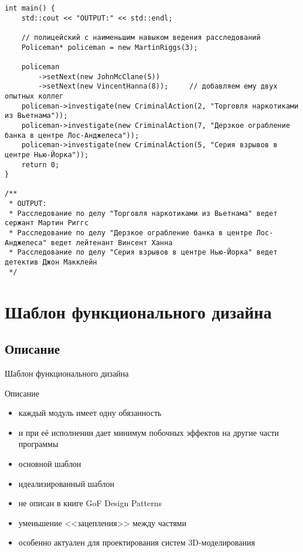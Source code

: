 \documentclass{beamer}
\begin{document}
\begin{frame}[fragile]
\begin{verbatim}
int main() {
	std::cout << "OUTPUT:" << std::endl;

	// полицейский с наименьшим навыком ведения расследований
	Policeman* policeman = new MartinRiggs(3);  

	policeman
		->setNext(new JohnMcClane(5))
		->setNext(new VincentHanna(8));     // добавляем ему двух опытных коллег
	policeman->investigate(new CriminalAction(2, "Торговля наркотиками из Вьетнама"));
	policeman->investigate(new CriminalAction(7, "Дерзкое ограбление банка в центре Лос-Анджелеса"));
	policeman->investigate(new CriminalAction(5, "Серия взрывов в центре Нью-Йорка"));
	return 0;
}

/**
 * OUTPUT:
 * Расследование по делу "Торговля наркотиками из Вьетнама" ведет сержант Мартин Риггс
 * Расследование по делу "Дерзкое ограбление банка в центре Лос-Анджелеса" ведет лейтенант Винсент Ханна
 * Расследование по делу "Серия взрывов в центре Нью-Йорка" ведет детектив Джон Макклейн
 */
\end{verbatim}
\end{frame}

\section{Шаблон функционального дизайна}
\subsection{Описание}
\begin{frame}[fragile]
Шаблон функционального дизайна \\
\medskip

Описание \pause
\begin{itemize}
	\item каждый модуль имеет одну обязанность \pause
	\item и при её исполнении дает минимум побочных эффектов на другие части
	программы \pause
	\item основной шаблон \pause
	\item идеализированный шаблон \pause
	\item не описан в книге GoF Design Patterns \pause
	\item уменьшение <<зацепления>> между частями \pause
	\item особенно актуален для проектирования систем 3D-моделирования
\end{itemize}

\end{frame}
\end{document}
